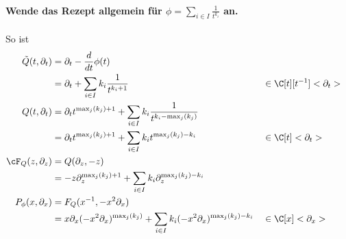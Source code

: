 \begin{comment}
warum sind diese wichtig??
\end{comment}

\paragraph{Wende das Rezept allgemein für
$\phi=\sum_{i\in I}\frac{1}{t^{k_i}}$ an.}
So ist
\begin{align*}
\tilde Q(t,\partial_t) &=\partial_t-\frac{d}{dt}\phi(t) \\
                       &=\partial_t+\sum_{i\in I} k_i\frac{1}{t^{k_i+1}}
                       & &\in \C[t][t^{-1}]<\partial_t>\\
Q(t,\partial_t)        &=\partial_tt^{\max_j(k_j)+1}
                         +\sum_{i\in I} k_i\frac{1}{t^{k_i-\max_j(k_j)}} \\
                       &=\partial_tt^{\max_j(k_j)+1}
                         +\sum_{i\in I} k_it^{\max_j(k_j)-k_i}
                       & &\in \C[t]<\partial_t>\\
\cF_Q(z,\partial_z)    &=Q(\partial_z,-z)\\
                       &=-z\partial_z^{\max_j(k_j)+1}
                         +\sum_{i\in I} k_i\partial_z^{\max_j(k_j)-k_i} \\
P_{\phi}(x,\partial_x) &=F_Q(x^{-1},-x^2\partial_x) \\
                       &=x\partial_x(-x^2\partial_x)^{\max_j(k_j)}
                         +\sum_{i\in I} k_i(-x^2\partial_x)^{\max_j(k_j)-k_i}
                       & &\in \C[x]<\partial_x>
\end{align*}

